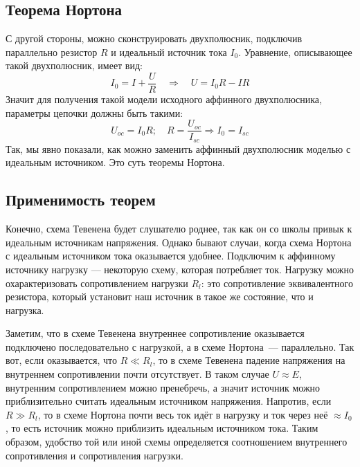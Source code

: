 \documentclass[11pt,a4paper]{article}
\begin{document}
\subsection{Теорема Нортона}
С другой стороны, можно сконструировать двухполюсник, подключив параллельно резистор $R$ и идеальный источник тока $I_0$. Уравнение, описывающее такой двухполюсник, имеет вид:
$$
I_0 = I + \frac{U}{R} \quad \Rightarrow \quad U = I_0R - IR
$$
Значит для получения такой модели исходного аффинного двухполюсника, параметры цепочки должны быть такими:
$$
U_{oc} = I_0R; \quad R = \frac{U_{oc}}{I_{sc}} \Rightarrow I_0 = I_{sc}
$$
Так, мы явно показали, как можно заменить аффинный двухполюсник моделью с идеальным источником. Это суть теоремы Нортона.

\subsection{Применимость теорем}

Конечно, схема Тевенена будет слушателю роднее, так как он со школы
привык к идеальным источникам напряжения. Однако бывают случаи, когда
схема Нортона с идеальным источником тока оказывается удобнее. Подключим
к аффинному источнику нагрузку --- некоторую схему, которая потребляет
ток. Нагрузку можно охарактеризовать сопротивлением нагрузки $R_l$: это
сопротивление эквивалентного резистора, который установит наш источник в
такое же состояние, что и нагрузка.

Заметим, что в схеме Тевенена внутреннее сопротивление оказывается
подключено последовательно с нагрузкой, а в схеме Нортона~--- параллельно.
Так вот, если оказывается, что $R \ll R_l$, то в схеме Тевенена падение
напряжения на внутреннем сопротивлении почти отсутствует. В таком случае
$U \approx E$, внутренним сопротивлением можно пренебречь, а значит
источник можно приблизительно считать идеальным источником напряжения.
Напротив, если $R \gg R_l$, то в схеме Нортона почти весь ток идёт в
нагрузку и ток через неё $\approx I_0$, то есть источник можно приблизить
идеальным источником тока. Таким образом, удобство той или иной схемы
определяется соотношением внутреннего сопротивления и сопротивления
нагрузки.
\end{document}
